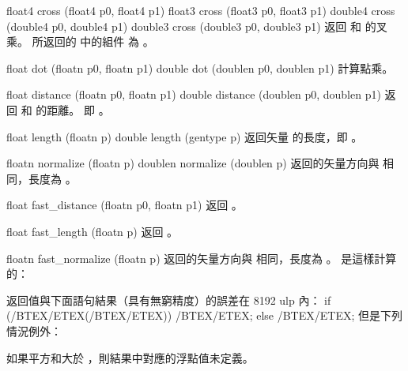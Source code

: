 float4 cross (float4 p0, float4 p1)
float3 cross (float3 p0, float3 p1)
double4 cross (double4 p0, double4 p1)
double3 cross (double3 p0, double3 p1)
\stopbuffer
{}
返回  和  的叉乘。
所返回的  中的組件  為 。
\stopbuffer

float dot (floatn p0, floatn p1)
double dot (doublen p0, doublen p1)
\stopbuffer
{}
計算點乘。
\stopbuffer

float distance (floatn p0,
		floatn p1)
double distance (doublen p0,
		doublen p1)
\stopbuffer
{}
返回  和  的距離。
即 。
\stopbuffer

float length (floatn p)
double length (gentype p)
\stopbuffer
{}
返回矢量  的長度，即 。
\stopbuffer

floatn normalize (floatn p)
doublen normalize (doublen p)
\stopbuffer
{}
返回的矢量方向與  相同，長度為 。
\stopbuffer

float fast_distance (floatn p0,
		floatn p1)
\stopbuffer
{}
返回 。
\stopbuffer

float fast_length (floatn p)
\stopbuffer
{}
返回 。
\stopbuffer

floatn fast_normalize (floatn p)
\stopbuffer
{}
返回的矢量方向與  相同，長度為 。
 是這樣計算的：


返回值與下面語句結果（具有無窮精度）的誤差在 8192 ulp 內：
\startcintbl[escape=yes,indentnext=no]
if (/BTEX/ETEX(/BTEX/ETEX))
	/BTEX/ETEX;
else
	/BTEX/ETEX;
\stopcintbl
但是下列情況例外：
\startigNum
\item 如果平方和大於 ，則結果中對應的浮點值未定義。

